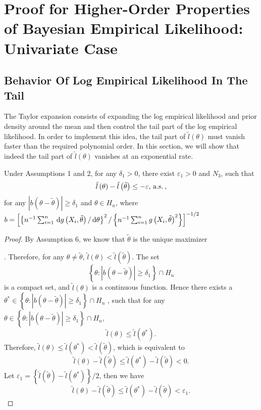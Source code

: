 \chapter{Proof for Higher-Order Properties of Bayesian Empirical Likelihood:
Univariate Case}

\section{Behavior Of Log Empirical Likelihood In  The Tail}

The Taylor expansion consists of  expanding the log empirical
likelihood and prior density around the mean and  then control
the tail part of the log empirical likelihood. In order to implement
this idea, the tail part of $\tilde{l}\left(\theta\right)$ must vanish
faster than the required polynomial order. In this section,
we will show that indeed the tail part of $\tilde{l}\left(\theta\right)$
vanishes at an exponential rate.
\begin{lemma}
\label{lemma:exponential-decay-tail} Under  Assumptions 1 and 2, for any $\delta_{1}>0$, there
exist $\varepsilon_{1}>0$ and $N_{3}$, such that 
\[
\tilde{l}\left(\theta\right)-\tilde{l}\left(\tilde{\theta}\right)\le-\varepsilon,\,\mathrm{a.s.}\,,
\]
for any $\left|b\left(\theta-\tilde{\theta}\right)\right|\ge\delta_{1}$
and $\theta\in H_n$, where $b=\left[\left\{ n^{-1}\sum_{i=1}^{n}\,\mathrm{d} g\left(X_{i},\tilde{\theta}\right)/\,\mathrm{d}\theta\right\} ^{2}/\left\{ n^{-1}\sum_{i=1}^{n}g\left(X_{i},\tilde{\theta}\right)^{2}\right\} \right]^{-1/2}$\end{lemma}
\begin{proof}
By Assumption 6, we know that $\tilde{\theta}$ is the unique maximizer%
\begin{comment}
need to be assume
\end{comment}
. Therefore, for any $\theta\neq\tilde{\theta}$, $\tilde{l}\left(\theta\right)<\tilde{l}\left(\tilde{\theta}\right)$.
The set 
\[
\left\{ \theta:\left|b\left(\theta-\tilde{\theta}\right)\right|\ge\delta_{1}\right\} \cap H_n
\]
is a compact set, and $\tilde{l}\left(\theta\right)$ is a continuous
function. Hence there exists a $\theta^{*}\in\left\{ \theta:\left|b\left(\theta-\tilde{\theta}\right)\right|\ge\delta_{1}\right\} \cap H_n$
, such that for any $\theta\in\left\{ \theta:\left|b\left(\theta-\tilde{\theta}\right)\right|\ge\delta_{1}\right\} \cap H_n$,
\[
\tilde{l}\left(\theta\right)\le\tilde{l}\left(\theta^{*}\right).
\]
Therefore, $\tilde{l}\left(\theta\right)\le\tilde{l}\left(\theta^{*}\right)<\tilde{l}\left(\tilde{\theta}\right)$, which is equivalent to 
\[
\tilde{l}\left(\theta\right)-\tilde{l}\left(\tilde{\theta}\right)\le\tilde{l}\left(\theta^{*}\right)-\tilde{l}\left(\tilde{\theta}\right)<0.
\]
Let $\varepsilon_{1}=\left\{ \tilde{l}\left(\tilde{\theta}\right)-\tilde{l}\left(\theta^{*}\right)\right\} /2$,
then we have 
\[
\tilde{l}\left(\theta\right)-\tilde{l}\left(\tilde{\theta}\right)\le\tilde{l}\left(\theta^{*}\right)-\tilde{l}\left(\tilde{\theta}\right)<\varepsilon_{1}.
\]

\end{proof}

